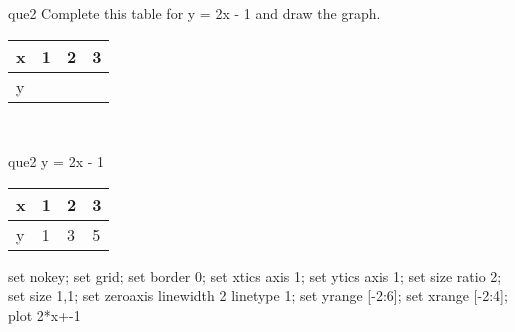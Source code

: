 \documentclass[13.5pt, varwidth=true]{beamer}
\begin{document}
\begin{frame}[shrink=19,fragile]
	\begin{beamercolorbox}[rounded=true, left, shadow=true,wd=14.8cm]{que2}
		 Complete this table for y = 2x - 1 and draw the graph. \\[0.3cm] \renewcommand{\arraystretch}{1.2}\begin{tabular}{|C|C|C|C|} \hline x & 1 & 2 & 3 \\ \hline y & & & \\ \hline \end{tabular}\\[0.3cm]
	\end{beamercolorbox}
\end{frame}
\begin{frame}[shrink=19,fragile]
	\begin{beamercolorbox}[rounded=true, left, shadow=true,wd=14.8cm]{que2}
		y = 2x - 1\renewcommand{\arraystretch}{1.2}\begin{tabular}{|C|C|C|C|} \hline x & 1 & 2 & 3 \\ \hline y & 1 & 3 & 5\\ \hline \end{tabular}\begin{gnuplot}[terminal=pdf] set nokey; set grid; set border 0; set xtics axis 1; set ytics axis 1; set size ratio 2; set size 1,1; set zeroaxis linewidth 2 linetype 1; set yrange [-2:6]; set xrange [-2:4]; plot 2*x+-1 \end{gnuplot}
	\end{beamercolorbox}
\end{frame}
\end{document}
